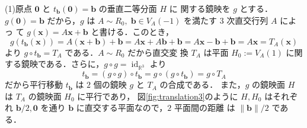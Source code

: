 \documentclass[11pt, uplatex, dvipdfmx, titlepage]{jsarticle}
\makeatletter
\DeclareMathOperator{\Fix}{Fix}
\DeclareMathOperator{\id}{id}
\renewenvironment{proof}[1][\proofname]{\par
  \pushQED{\qed}%
  \normalfont \topsep6\p@\@plus6\p@\relax
  \trivlist
  \item[\hskip\labelsep
         \bfseries
    {#1}]\ignorespaces
}{%
  \popQED\endtrivlist\@endpefalse
}
\theoremstyle{definition}
\renewcommand{\proofname}{\textbf{証明}}
\makeatother
\begin{document}
\begin{proof}
  (1)原点 $\bm{0}$ と $t_{\bm{b}}(\bm{0})=\bm{b}$ の垂直二等分面 $H$ に
  関する鏡映を $g$ とする．$g(\bm{0})=\bm{b}$ だから，$g$ は
  $A \sim R_0, \; \bm{b} \in V_A(-1)$ を満たす $3$ 次直交行列 $A$ によっ
  て $g(\bm{x}) = A\bm{x} + \bm{b}$ と書ける．このとき，
  \[
    g\left( t_{\bm{b}}(\bm{x})\right) = A(\bm{x}+\bm{b})+\bm{b} =
    A\bm{x} + A\bm{b} + \bm{b} = A\bm{x} -\bm{b} +\bm{b}=A\bm{x} = T_A(\bm{x})
  \]
  より $g\circ t_{\bm{b}} = T_A$ である．$A \sim R_0$ だから直交変
  換 $T_A$ は平面 $H_0:=V_A(1)$ に関する鏡映である．さらに，$g\circ g =
  \id_{\mathbb{R}^3}$ より
  \[
    t_{\bm{b}}= \left( g \circ g\right) \circ t_{\bm{b}} = g\circ \left( g \circ t_{\bm{b}}\right) = g \circ T_A
  \]
  だから平行移動 $t_{\bm{b}}$ は $2$ 個の鏡映 $g$ と $T_A$ の合成である．
  また，$g$ の鏡映面 $H$ は $T_A$ の鏡映面 $H_0$ に平行であり，
  図\ref{fig:translation3}のように $H, H_0$ はそれぞれ $\bm{b}/2,
  \bm{0}$ を通り $\bm{b}$ に直交する平面なので，$2$ 平面間の距離
  は $\|\bm{b}\|/2$ である．

\end{proof}
\end{document}

